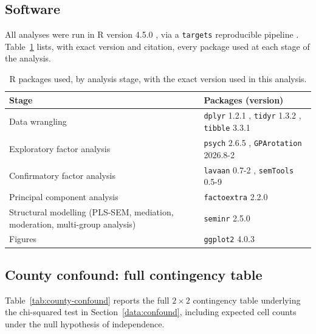 \subsection{Software}
\label{app:software}

All analyses were run in R version 4.5.0 \citep{Rcore}, via a
\texttt{targets} reproducible pipeline \citep{Rtargets}. Table~\ref{tab:packages}
lists, with exact version and citation, every package used at each stage of
the analysis.

\begin{table}[htbp]
\centering
\caption{R packages used, by analysis stage, with the exact version used in
this analysis.}
\label{tab:packages}
\begin{tabular}{p{4.3cm}p{7.7cm}}
\hline
\textbf{Stage} & \textbf{Packages (version)} \\
\hline
Data wrangling & \texttt{dplyr} 1.2.1 \citep{Rdplyr}, \texttt{tidyr} 1.3.2 \citep{Rtidyr}, \texttt{tibble} 3.3.1 \citep{Rtibble} \\
Exploratory factor analysis & \texttt{psych} 2.6.5 \citep{Rpsych}, \texttt{GPArotation} 2026.8-2 \citep{RGPArotation} \\
Confirmatory factor analysis & \texttt{lavaan} 0.7-2 \citep{Rlavaan}, \texttt{semTools} 0.5-9 \citep{RsemTools} \\
Principal component analysis & \texttt{factoextra} 2.2.0 \citep{Rfactoextra} \\
Structural modelling (PLS-SEM, mediation, moderation, multi-group analysis) & \texttt{seminr} 2.5.0 \citep{Rseminr} \\
Figures & \texttt{ggplot2} 4.0.3 \citep{Rggplot2} \\
\hline
\end{tabular}
\end{table}

\subsection{County confound: full contingency table}
\label{app:county-confound}

Table~\ref{tab:county-confound} reports the full $2\times2$ contingency table
underlying the chi-squared test in Section~\ref{data:confound}, including
expected cell counts under the null hypothesis of independence.

